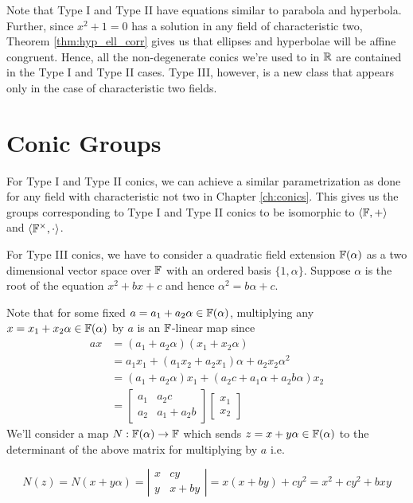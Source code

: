 \noindent
Note that Type I and Type II have equations similar to parabola and hyperbola.
Further, since $x^2 + 1 = 0$ has a solution in any field of characteristic two,
Theorem \ref{thm:hyp_ell_corr} gives us that ellipses and hyperbolae will be
affine congruent. Hence, all the non-degenerate conics we're used to in $\mathbb{R}$ are
contained in the Type I and Type II cases. Type III, however, is a new class that
appears only in the case of characteristic two fields.


\section{Conic Groups}

For Type I and Type II conics, we can achieve a similar parametrization as done
for any field with characteristic not two in Chapter \ref{ch:conics}. This gives
us the groups corresponding to Type I and Type II conics to be isomorphic to
$\langle\mathbb{F},+\rangle$ and $\langle\mathbb{F}^\times,\cdot\rangle$.
\vspace{1ex}

\noindent
For Type III conics, we have to consider a quadratic field extension $\mathbb{F}(\alpha)$
as a two dimensional vector space over $\mathbb{F}$ with an ordered basis $\{1,\alpha\}$.
Suppose $\alpha$ is the root of the equation $x^2 + bx + c$ and hence
$\alpha^2 = b\alpha+c$.

Note that for some fixed $a=a_1+a_2\alpha\in\mathbb{F}(\alpha)$, multiplying any
$x=x_1+x_2\alpha\in\mathbb{F}(\alpha)$ by $a$ is an $\mathbb{F}$-linear map since
\begin{align*}
    ax &= (a_1+a_2\alpha)(x_1+x_2\alpha) \\
       &= a_1 x_1 + (a_1 x_2 + a_2 x_1)\alpha + a_2 x_2 \alpha^2 \\
       &= (a_1 + a_2\alpha)x_1 + (a_2 c + a_1\alpha + a_2 b\alpha)x_2 \\
       &= \begin{bmatrix}a_1 & a_2 c \\ a_2 & a_1 + a_2 b\end{bmatrix}
          \begin{bmatrix}x_1 \\ x_2\end{bmatrix}
   \end{align*}
We'll consider a map $N:\mathbb{F}(\alpha)\to\mathbb{F}$ which sends $z=x+y\alpha\in\mathbb{F}(\alpha)$ to
the determinant of the above matrix for multiplying by $a$ i.e.

\[
    N(z) = N(x + y\alpha)
    = \left|\begin{matrix}x & cy \\ y & x + by\end{matrix}\right|
    = x(x + by) + c y^2
    = x^2 + cy^2 + bxy
\]

